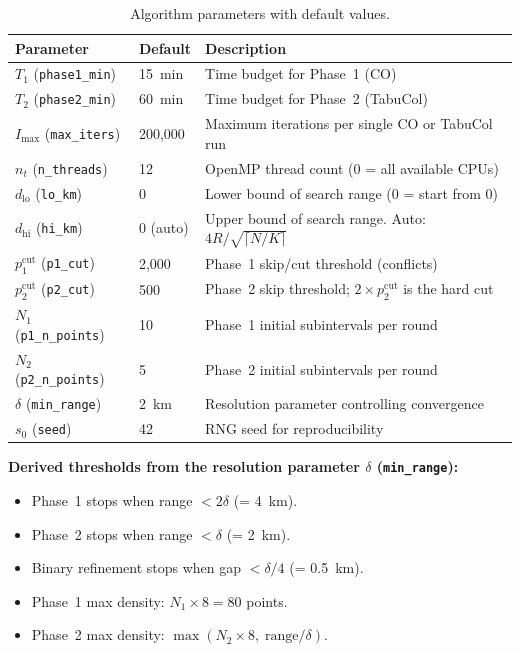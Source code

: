 \documentclass[11pt,a4paper]{article}
\begin{document}
\begin{table}[ht]
\centering
\caption{Algorithm parameters with default values.}
\begin{tabular}{@{}lll@{}}
\toprule
Parameter & Default & Description \\
\midrule
$T_1$ (\texttt{phase1\_min}) & 15~min & Time budget for Phase~1 (CO) \\
$T_2$ (\texttt{phase2\_min}) & 60~min & Time budget for Phase~2 (TabuCol) \\
$I_{\max}$ (\texttt{max\_iters}) & 200,000 & Maximum iterations per single CO or TabuCol run \\
$n_t$ (\texttt{n\_threads}) & 12 & OpenMP thread count (0 = all available CPUs) \\
$d_{\text{lo}}$ (\texttt{lo\_km}) & 0 & Lower bound of search range (0 = start from 0) \\
$d_{\text{hi}}$ (\texttt{hi\_km}) & 0 (auto) & Upper bound of search range. Auto: $4R / \sqrt{\lceil N/K \rceil}$ \\
$p_1^{\text{cut}}$ (\texttt{p1\_cut}) & 2,000 & Phase~1 skip/cut threshold (conflicts) \\
$p_2^{\text{cut}}$ (\texttt{p2\_cut}) & 500 & Phase~2 skip threshold; $2 \times p_2^{\text{cut}}$ is the hard cut \\
$N_1$ (\texttt{p1\_n\_points}) & 10 & Phase~1 initial subintervals per round \\
$N_2$ (\texttt{p2\_n\_points}) & 5 & Phase~2 initial subintervals per round \\
$\delta$ (\texttt{min\_range}) & 2~km & Resolution parameter controlling convergence \\
$s_0$ (\texttt{seed}) & 42 & RNG seed for reproducibility \\
\bottomrule
\end{tabular}
\end{table}

\textbf{Derived thresholds from the resolution parameter $\delta$
(\texttt{min\_range}):}
\begin{itemize}
  \item Phase~1 stops when range $< 2\delta$ (= 4~km).
  \item Phase~2 stops when range $< \delta$ (= 2~km).
  \item Binary refinement stops when gap $< \delta / 4$ (= 0.5~km).
  \item Phase~1 max density: $N_1 \times 8 = 80$ points.
  \item Phase~2 max density:
        $\max(N_2 \times 8,\; \text{range} / \delta)$.
\end{itemize}
\end{document}
